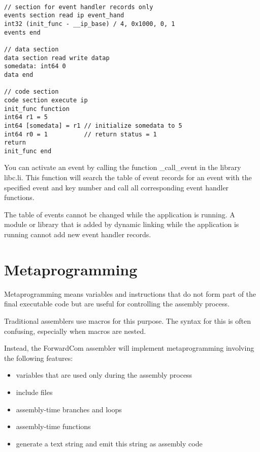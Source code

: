 \documentclass[forwardcom.tex]{subfiles}
\begin{document}
\begin{example}
\label{exampleEventHandler}
\end{example} %
\begin{lstlisting}[frame=single]

// section for event handler records only
events section read ip event_hand
int32 (init_func - __ip_base) / 4, 0x1000, 0, 1
events end

// data section
data section read write datap
somedata: int64 0
data end

// code section
code section execute ip
init_func function
int64 r1 = 5
int64 [somedata] = r1 // initialize somedata to 5
int64 r0 = 1          // return status = 1
return
init_func end

\end{lstlisting}
\vspace{4mm}

You can activate an event by calling the function \_call\_event in the library libc.li.
This function will search the table of event records for an event with the specified 
event and key number and call all corresponding event handler functions.
\vv

The table of events cannot be changed while the application is running. 
A module or library that is added by dynamic linking while the application is running
cannot add new event handler records.
\vv



\section{Metaprogramming} \label{assemblyMetaprogramming}
Metaprogramming means variables and instructions that do not form part of the final executable code but 
are useful for controlling the assembly process.
\vv

Traditional assemblers use macros for this purpose. The syntax for this is often confusing, especially when macros are nested.
\vv

Instead, the ForwardCom assembler will implement metaprogramming involving the following features:

\begin{itemize}
\item variables that are used only during the assembly process
\item include files
\item assembly-time branches and loops
\item assembly-time functions
\item generate a text string and emit this string as assembly code
\end{itemize}
\end{document}
